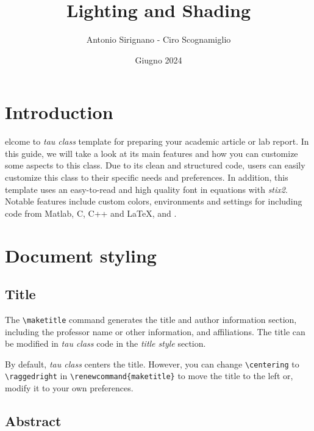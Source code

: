 \documentclass[9pt,a4paper,twoside]{tau}
\title{Lighting and Shading}
\author{Antonio Sirignano - Ciro Scognamiglio}
\date{Giugno 2024}
\begin{document}
		
	\maketitle
	\thispagestyle{firststyle}
	\tauabstract
	\tableofcontents


\section{Introduction}

    elcome to \textit{tau class} template for preparing your academic article or lab report. In this guide, we will take a look at its main features and how you can customize some aspects to this class. Due to its clean and structured code, users can easily customize this class to their specific needs and preferences. In addition, this template uses an easy-to-read and high quality font in equations with \textit{stix2}. Notable features include custom colors, environments and settings for including code from Matlab, C, C++ and \LaTeX, and .
    
\section{Document styling}

    \subsection{Title}
	
        The \verb*|\maketitle| command generates the title and author information section, including the professor name or other information, and affiliations. The title can be modified in \textit{tau class} code in the \textit{title style} section. 
 
        By default, \textit{tau class} centers the title. However, you can change \verb*|\centering| to \verb*|\raggedright| in \verb*|\renewcommand{maketitle}| to move the title to the left or, modify it to your own preferences.
	
    \subsection{Abstract}
	
\end{document}
